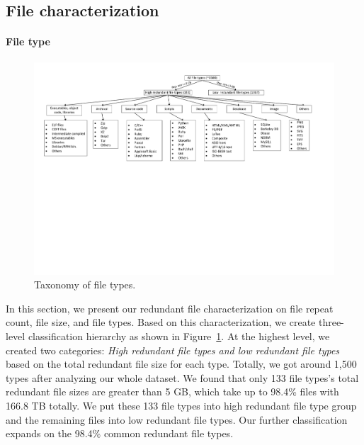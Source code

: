 \subsection{File characterization}

\paragraph{File type}

\begin{figure}
	\centering
	\includegraphics[width=1\textwidth]{graphs/graph-types-hierarchy}
	\caption{Taxonomy of file types.
	}
	\label{fig:file-type-hierarchy}
\end{figure}

In this section, we present our redundant file characterization on file repeat count, file size, and file types. 
Based on this characterization, we create three-level classification hierarchy as shown in Figure~\ref{fig:file-type-hierarchy}.
At the highest level, we created two categories: \textit{High redundant file types and low redundant file types} based on the total redundant file size for each type. 
Totally, we got around 1,500 types after analyzing our whole dataset. 
We found that only 133 file types's total redundant file sizes are greater than 5 GB, which take up to 98.4\% files with 166.8 TB totally. We put these 133 file types into high redundant file type group and the remaining files into low redundant file types. Our further classification expands on the 98.4\% common redundant file types. 
%

